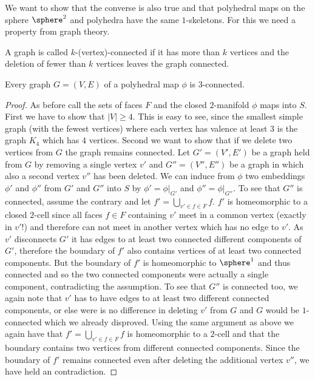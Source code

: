 We want to show that the converse is also true and that polyhedral maps on the sphere $\sphere^2$ and polyhedra have the same $1$-skeletons. For this we need a property from graph theory.

\begin{definition} A graph is called $k$-(vertex)-connected if it has more than $k$ vertices and the deletion of fewer than $k$ vertices leaves the graph connected.
\end{definition}

\begin{proposition} Every graph $G = (V, E)$ of a polyhedral map $\phi$ is $3$-connected.
  \begin{proof}
    As before call the sets of faces $F$ and the closed $2$-manifold $\phi$ maps into $S$. First we have to show that $|V| \geq 4$. This is easy to see, since the smallest simple graph (with the fewest vertices) where each vertex has valence at least $3$ is the graph $K_4$ which has $4$ vertices. Second we want to show that if we delete two vertices from $G$ the graph remains connected. Let $G' = (V', E')$ be a graph held from $G$ by removing a single vertex $v'$ and $G'' = (V'', E'')$ be a graph in which also a second vertex $v''$ has been deleted. We can induce from $\phi$ two embeddings $\phi'$ and $\phi''$ from $G'$ and $G''$ into $S$ by $\phi' = \phi|_{G'}$ and $\phi'' = \phi|_{G''}$. To see that $G''$ is connected, assume the contrary and let $f' = \bigcup_{v' \in f \in F} f$. $f'$ is homeomorphic to a closed $2$-cell since all faces $f \in F$ containing $v'$ meet in a common vertex (exactly in $v'$!) and therefore can not meet in another vertex which has no edge to $v'$. As $v'$ disconnects $G'$ it has edges to at least two connected different components of $G'$, therefore the boundary of $f'$ also contains vertices of at least two connected components. But the boundary of $f'$ is homeomorphic to $\sphere^1$ and thus connected and so the two connected components were actually a single component, contradicting the assumption. To see that $G''$ is connected too, we again note that $v'$ has to have edges to at least two different connected components, or else were is no difference in deleting $v'$ from $G$ and $G$ would be $1$-connected which we already disproved. Using the same argument as above we again have that $f' = \bigcup_{v' \in f \in F} f$ is homeomorphic to a $2$-cell and that the boundary contains two vertices from different connected components. Since the boundary of $f'$ remains connected even after deleting the additional vertex $v''$, we have held an contradiction.
  \end{proof}
\end{proposition}


